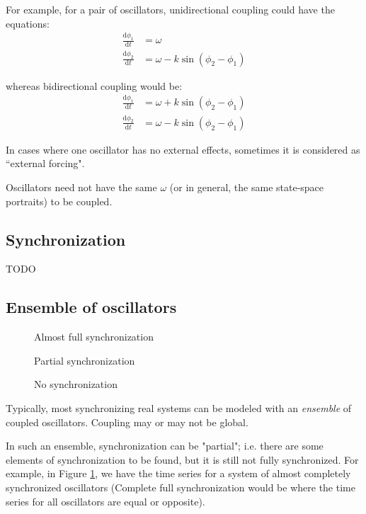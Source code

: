 \documentclass[12pt]{article}
\newcommand{\dt}[1]{\frac{\mathrm d #1}{\mathrm dt}}
\begin{document}
For example, for a pair of oscillators, unidirectional coupling could have the equations:
\begin{align*}
\dt{\phi_1} &= \omega \\
\dt{\phi_2} &= \omega - k\sin(\phi_2 - \phi_1)
\end{align*}

whereas bidirectional coupling would be:
\begin{align*}
\dt{\phi_1} &= \omega + k\sin(\phi_2 - \phi_1)\\
\dt{\phi_2} &= \omega - k\sin(\phi_2 - \phi_1)
\end{align*}

In cases where one oscillator has no external effects, sometimes it is considered as ``external forcing".


Oscillators need not have the same $\omega$ (or in general, the same state-space portraits) to be coupled.

\subsection{Synchronization}
TODO
\subsection{Ensemble of oscillators}
\begin{figure}
\centering

\caption{Almost full synchronization}\label{fig:fullgraph}
\end{figure}

\begin{figure}
\centering


\caption{Partial synchronization}\label{fig:partialgraph}
\end{figure}

\begin{figure}
\centering


\caption{No synchronization}\label{fig:nograph}
\end{figure}
Typically, most synchronizing real systems can be modeled with an \emph{ensemble} of coupled oscillators. Coupling may or may not be global.

In such an ensemble, synchronization can be "partial"; i.e. there are some elements of synchronization to be found, but it is still not fully synchronized. For example, in Figure \ref{fig:fullgraph}, we have the time series for a system of almost completely synchronized oscillators (Complete full synchronization would be where the time series for all oscillators are equal or opposite).
\end{document}
